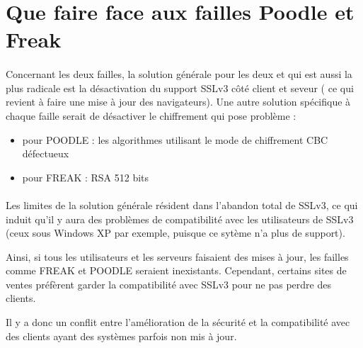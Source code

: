 \section{Que faire face aux failles Poodle et Freak}

\paragraph{}
Concernant les deux failles, la solution générale pour les deux et qui est aussi la plus radicale est la désactivation du support SSLv3 c\^oté client et seveur ( ce qui revient à faire une mise à jour des navigateurs). Une autre solution spécifique à chaque faille serait de désactiver le chiffrement qui pose problème :
\begin{itemize}
\item pour POODLE : les algorithmes utilisant le mode de chiffrement CBC défectueux
\item pour FREAK : RSA 512 bits
\end {itemize}

\paragraph{}
Les limites de la solution générale résident dans l'abandon total de SSLv3, ce qui induit qu'il y aura des problèmes de compatibilité avec les utilisateurs de SSLv3 (ceux sous Windows XP par exemple, puisque ce sytème n'a plus de support).

Ainsi, si tous les utilisateurs et les serveurs faisaient des mises à jour, les failles comme FREAK et POODLE seraient inexistants. Cependant, certains sites de ventes préfèrent garder la compatibilité avec SSLv3 pour ne pas perdre des clients.

Il y a donc un conflit entre l'amélioration de la sécurité et la compatibilité avec des clients ayant des systèmes parfois non mis à jour.







 
